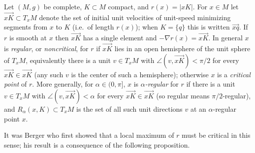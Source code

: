 \begin{definition}
  \label{def:pet-ch12-alpha-regular}

  Let $(M,g)$ be complete, $K\subset M$ compact, and $r(x)=|xK|$. For
  $x\in M$ let $\overrightarrow{xK}\subset T_xM$ denote the set of initial
  unit velocities of unit-speed minimizing segments from $x$ to $K$ (i.e.\ of
  length $r(x)$); when $K=\{q\}$ this is written $\overrightarrow{xq}$. If $r$
  is smooth at $x$ then $\overrightarrow{xK}$ has a single element and
  $-\nabla r(x)=\overrightarrow{xK}$. In general $x$ is \emph{regular}, or
  \emph{noncritical}, for $r$ if $\overrightarrow{xK}$ lies in an open
  hemisphere of the unit sphere of $T_xM$, equivalently there is a unit
  $v\in T_xM$ with $\angle(v,\overrightarrow{xK})<\pi/2$ for every
  $\overrightarrow{xK}\in\overrightarrow{xK}$ (any such $v$ is the center of
  such a hemisphere); otherwise $x$ is a \emph{critical point} of $r$. More
  generally, for $\alpha\in(0,\pi]$, $x$ is \emph{$\alpha$-regular} for $r$ if
  there is a unit $v\in T_xM$ with $\angle(v,\overrightarrow{xK})<\alpha$ for
  every $\overrightarrow{xK}\in\overrightarrow{xK}$ (so regular means
  $\pi/2$-regular), and $R_\alpha(x,K)\subset T_xM$ is the set of all such
  unit directions $v$ at an $\alpha$-regular point $x$.
\end{definition}

It was Berger who first showed that a local maximum of $r$ must be critical
in this sense; his result is a consequence of the following proposition.

